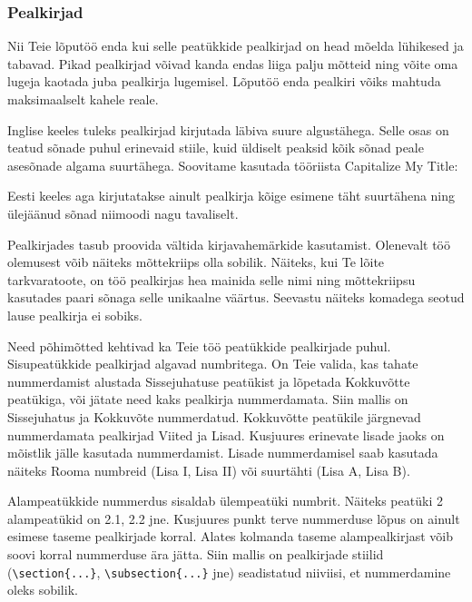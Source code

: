 \subsubsection{Pealkirjad}
Nii Teie lõputöö enda kui selle peatükkide pealkirjad on head mõelda lühikesed ja tabavad. Pikad pealkirjad võivad kanda endas liiga palju mõtteid ning võite oma lugeja kaotada juba pealkirja lugemisel. Lõputöö enda pealkiri võiks mahtuda maksimaalselt kahele reale.

Inglise keeles tuleks pealkirjad kirjutada läbiva suure algustähega. Selle osas on teatud sõnade puhul erinevaid stiile, kuid üldiselt peaksid kõik sõnad peale asesõnade algama suurtähega. Soovitame kasutada tööriista Capitalize My Title:  

Eesti keeles aga kirjutatakse ainult pealkirja kõige esimene täht suurtähena ning ülejäänud sõnad niimoodi nagu tavaliselt.

Pealkirjades tasub proovida vältida kirjavahemärkide kasutamist. Olenevalt töö olemusest võib näiteks mõttekriips olla sobilik. Näiteks, kui Te lõite tarkvaratoote, on töö pealkirjas hea mainida selle nimi ning mõttekriipsu kasutades paari sõnaga selle unikaalne väärtus. Seevastu näiteks komadega seotud lause pealkirja ei sobiks.

Need põhimõtted kehtivad ka Teie töö peatükkide pealkirjade puhul. Sisupeatükkide pealkirjad algavad numbritega. On Teie valida, kas tahate nummerdamist alustada Sissejuhatuse peatükist ja lõpetada Kokkuvõtte peatükiga, või jätate need kaks pealkirja nummerdamata. Siin mallis on Sissejuhatus ja Kokkuvõte nummerdatud. Kokkuvõtte peatükile järgnevad nummerdamata pealkirjad Viited ja Lisad. Kusjuures erinevate lisade jaoks on mõistlik jälle kasutada nummerdamist. Lisade nummerdamisel saab kasutada näiteks Rooma numbreid (Lisa I, Lisa II) või suurtähti (Lisa A, Lisa B).

Alampeatükkide nummerdus sisaldab ülempeatüki numbrit. Näiteks peatüki 2 alampeatükid on 2.1, 2.2 jne. Kusjuures punkt terve nummerduse lõpus on ainult esimese taseme pealkirjade korral. Alates kolmanda taseme alampealkirjast võib soovi korral nummerduse ära jätta. Siin mallis on pealkirjade stiilid (\verb|\section{...}|, \verb|\subsection{...}| jne) seadistatud niiviisi, et nummerdamine oleks sobilik.

